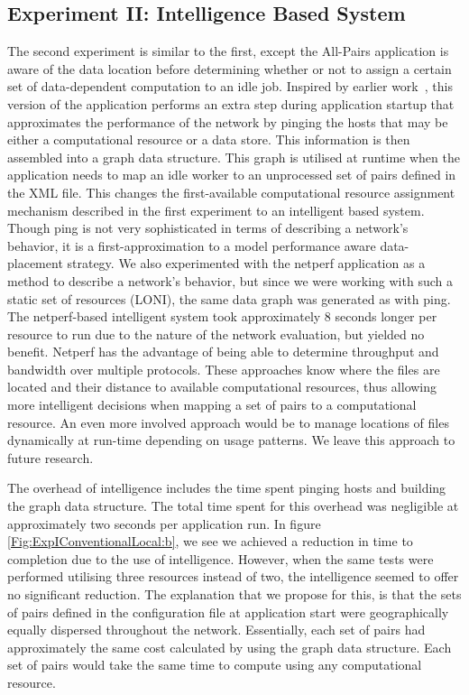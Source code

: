 \documentclass{rspublic}
\newcommand{\micnote}[1]{ {\textcolor{blue} { ***Michael: #1 }}}
\newcommand{\betynote}[1]{ {\textcolor{orange} { ***Bety: #1 }}}
\newcommand{\jhanote}[1]{} \newcommand{\micnote}[1]{}\newcommand{\betynote}[1]{} \newcommand{\fixme}[1]{}
\begin{document}
\subsection{Experiment II: Intelligence Based System}\label{Sec:Intelligence}
The second experiment is similar to the first, except the All-Pairs
application is aware of the data location before determining whether or
not to assign a certain set of data-dependent computation to an idle
job. Inspired by earlier work~\citep{netperf}, this version of the
application performs an extra step during application startup that
approximates the performance of the network by pinging the hosts that
may be either a computational resource or a data store. This information
is then assembled into a graph data structure. This graph is utilised at
runtime when the application needs to map an idle worker to an
unprocessed set of pairs defined in the XML file. This changes the
first-available computational resource assignment mechanism described in
the first experiment to an intelligent based system. Though ping is not
very sophisticated in terms of describing a network's behavior, it is a
first-approximation to a model performance aware data-placement
strategy. We also experimented with the netperf application
\citep{netperf_web} as a method to describe a network's behavior, but
since we were working with such a static set of resources (LONI), the
same data graph was generated as with ping. The netperf-based
intelligent system took approximately 8 seconds longer per resource to
run due to the nature of the network evaluation, but yielded no benefit.
Netperf has the advantage of being able to determine throughput and
bandwidth over multiple protocols. These approaches know where the files
are located and their distance to available computational resources,
thus allowing more intelligent decisions when mapping a set of pairs to
a computational resource. An even more involved approach would be to
manage locations of files dynamically at run-time depending on usage
patterns. We leave this approach to future research. 

The overhead of intelligence includes the time spent pinging hosts and
building the graph data structure. The total time spent for this
overhead was negligible at approximately two seconds per application
run. In figure \ref{Fig:ExpIConventionalLocal:b}, we see we achieved a reduction
in time to completion due to the use of intelligence. However, when the
same tests were performed utilising three resources instead of two, the
intelligence seemed to offer no significant reduction. The explanation
that we propose for this, is that the sets of pairs defined in the
configuration file at application start were geographically equally
dispersed throughout the network. Essentially, each set of pairs had
approximately the same cost calculated by using the graph data
structure. Each set of pairs would take the same time to compute using
any computational resource. %
\end{document}
